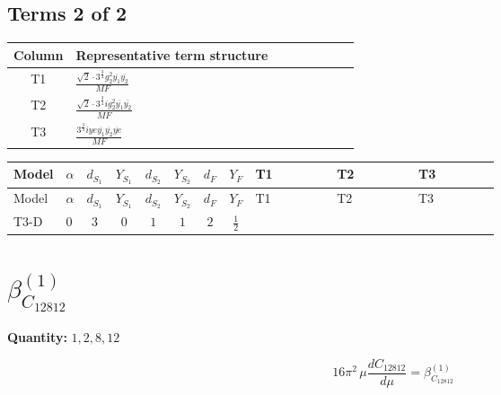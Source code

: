\documentclass[8pt]{article}
\begin{document}
\begin{landscape}
\subsection*{Terms 2 of 2}
\begin{center}
\begin{tabular}{@{}c >{\raggedright\arraybackslash}p{0.82\linewidth}@{}}
\toprule
Column & Representative term structure \\
\midrule
T1 & \(\displaystyle \frac{\sqrt{2} \cdot 3^{\frac{3}{4}} g_{2}^{2} \overline{y_{1}} \overline{y_{2}}}{MF}\) \\
\midrule
T2 & \(\displaystyle \frac{\sqrt{2} \cdot 3^{\frac{3}{4}} i g_{2}^{2} \overline{y_{1}} \overline{y_{2}}}{MF}\) \\
\midrule
T3 & \(\displaystyle \frac{3^{\frac{3}{4}} i ye \overline{y_{1}} \overline{y_{2}} \overline{ye}}{MF}\) \\
\midrule
\bottomrule
\end{tabular}
\end{center}
\smallskip
\tiny
\begin{longtable}{@{}llcccccc >{\raggedright\arraybackslash}p{0.21\linewidth} >{\raggedright\arraybackslash}p{0.21\linewidth} >{\raggedright\arraybackslash}p{0.21\linewidth}@{}}
\toprule
Model & $\alpha$ & $d_{S_1}$ & $Y_{S_1}$ & $d_{S_2}$ & $Y_{S_2}$ & $d_F$ & $Y_F$ & T1 & T2 & T3 \\
\midrule
\endfirsthead
\toprule
Model & $\alpha$ & $d_{S_1}$ & $Y_{S_1}$ & $d_{S_2}$ & $Y_{S_2}$ & $d_F$ & $Y_F$ & T1 & T2 & T3 \\
\midrule
\endhead
T3-D & $0$ & $3$ & $0$ & $1$ & $1$ & $2$ & $\frac{1}{2}$ & \scriptsize\adjustbox{max width=\linewidth}{$\begin{gathered} \frac{\sqrt{2} \cdot 3^{\frac{3}{4}} g_{2}^{2} \overline{y_{1}} \overline{y_{2}}}{6 MF}\end{gathered}$} & \scriptsize\adjustbox{max width=\linewidth}{$\begin{gathered} - \frac{\sqrt{2} \cdot 3^{\frac{3}{4}} i g_{2}^{2} \overline{y_{1}} \overline{y_{2}}}{6 MF}\end{gathered}$} & \scriptsize\adjustbox{max width=\linewidth}{$\begin{gathered} \frac{3^{\frac{3}{4}} i ye \overline{y_{1}} \overline{y_{2}} \overline{ye}}{12 MF}\end{gathered}$} \\
\midrule
\bottomrule
\end{longtable}
\clearpage
\section*{$\beta_{C_{12812}}^{(1)}$}
\noindent\textbf{Quantity: }$\mathrm{1,2,8,12}$\par\smallskip
\[16\pi^2\,\mu\frac{d C_{12812}}{d\mu}=\beta_{C_{12812}}^{(1)}\]

\end{landscape}
\end{document}
